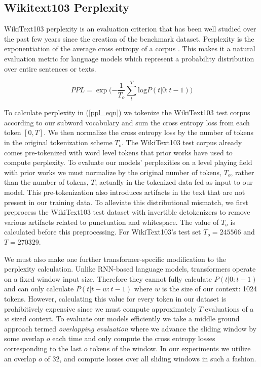 \documentclass{article}
\begin{document}
\subsection{Wikitext103 Perplexity}
WikiText103 perplexity is an evaluation criterion that has been well studied over the past few years since the creation of the benchmark dataset. Perplexity is the exponentiation of the average cross entropy of a corpus \citep{perplexity}. This makes it a natural evaluation metric for language models which represent a probability distribution over entire sentences or texts. 

\begin{equation}
 PPL= \exp({-\frac{1}{T_o}\sum_{t}^{T} \text{log} P(t|0:t-1))}
 \label{ppl_eqn}
\end{equation}

To calculate perplexity in (\ref{ppl_eqn}) we tokenize the WikiText103 test corpus according to our subword vocabulary and sum the cross entropy loss from each token $[0, T]$. We then normalize the cross entropy loss by the number of tokens in the original tokenization scheme $T_o$. The WikiText103 test corpus already comes pre-tokenized with word level tokens that prior works have used to compute perplexity. To evaluate our models' perplexities on a level playing field with prior works we must normalize by the original number of tokens, $T_o$, rather than the number of tokens, $T$, actually in the tokenized data fed as input to our model.  This pre-tokenization also introduces artifacts in the text that are not present in our training data. To alleviate this distributional mismatch, we first preprocess the WikiText103 test dataset with invertible detokenizers to remove various artifacts related to punctuation and whitespace. The value of $T_o$ is calculated before this preprocessing. For WikiText103's test set $T_o=245566$ and $T=270329$.

We must also make one further transformer-specific modification to the perplexity calculation. Unlike RNN-based language models, transformers operate on a fixed window input size. Therefore they cannot fully calculate $P(t|0:t-1)$ and can only calculate $P(t|t-w:t-1)$ where $w$ is the size of our context: 1024 tokens. However, calculating this value for every token in our dataset is prohibitively expensive since we must compute approximately $T$ evaluations of a $w$ sized context. To evaluate our models efficiently we take a middle ground approach termed \textit{overlapping evaluation} where we advance the sliding window by some overlap $o$ each time and only compute the cross entropy losses corresponding to the last $o$ tokens of the window. In our experiments we utilize an overlap $o$ of 32, and compute losses over all sliding windows in such a fashion.
\end{document}
